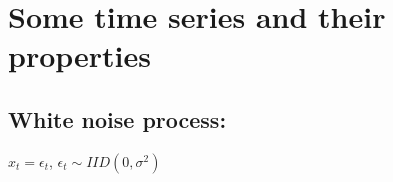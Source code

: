 \begin{enumerate}[(a)]
%
%
%
%
%
%
%
%
%
%
%
%

\end{enumerate}

%
%
%
%
%
%
%
%

\section{Some time series and their properties}


\subsection{White noise process:}  \(x_t = \epsilon_t\), \(\epsilon_t \sim IID(0, \sigma^2)\)

